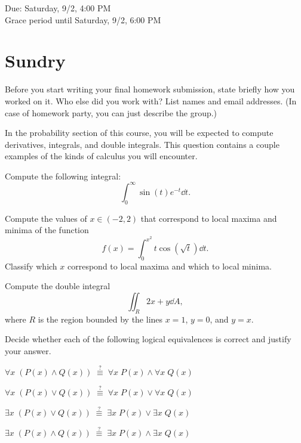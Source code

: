 \documentclass[11pt]{article}
\begin{document}
\maketitle
\fontsize{12}{15}\selectfont

\begin{center}
    Due: Saturday, 9/2, 4:00 PM \\
    Grace period until Saturday, 9/2, 6:00 PM \\
\end{center}

\section*{Sundry}
Before you start writing your final homework submission, state briefly how you worked on it.  Who else did you work with?  List names and email addresses.  (In case of homework party, you can just describe the group.)

\vspace{15pt}


In the probability section of this course, you will be expected to compute derivatives, integrals, and double integrals. This question contains a couple examples of the kinds of calculus you will encounter.

\begin{Parts}
    \Part Compute the following integral:
        \[
            \int_0^{\infty} \sin(t)e^{-t} \dd{t}.
        \]
    
    \Part Compute the values of $x \in (-2, 2)$ that correspond to local maxima and minima of the function
    \[f(x) = \int_{0}^{x^2} t\cos(\sqrt{t}) \dd{t}.\]
    Classify which $x$ correspond to local maxima and which to local minima.

    \Part Compute the double integral
    \[\iint_{R} 2x + y \dd{A},\]
    where $R$ is the region bounded by the lines $x = 1$, $y = 0$, and $y = x$.

\end{Parts}


Decide whether each of the following logical equivalences is correct and justify your answer. 

\begin{Parts}
    \Part $\forall x \; \left( P(x) \land Q(x) \right) \;\overset{?}{\equiv}\; \forall x \; P(x) \land \forall x \; Q(x)$
    
    \Part $\forall x \; \left( P(x) \lor Q(x) \right) \;\overset{?}{\equiv}\; \forall x \; P(x) \lor \forall x \; Q(x)$
    
    \Part $\exists x \; \left( P(x) \lor Q(x) \right) \;\overset{?}{\equiv}\; \exists x \; P(x) \lor \exists x \; Q(x)$
    
    \Part $\exists x \; \left( P(x) \land Q(x) \right) \;\overset{?}{\equiv}\; \exists x \; P(x) \land \exists x \; Q(x)$
    
\end{Parts}
\end{document}
